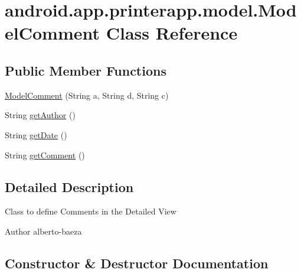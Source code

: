 \hypertarget{classandroid_1_1app_1_1printerapp_1_1model_1_1_model_comment}{}\section{android.\+app.\+printerapp.\+model.\+Model\+Comment Class Reference}
\label{classandroid_1_1app_1_1printerapp_1_1model_1_1_model_comment}
\subsection*{Public Member Functions}
\begin{DoxyCompactItemize}
\item 
\hyperlink{classandroid_1_1app_1_1printerapp_1_1model_1_1_model_comment_aa436158402c16efc4be81428acd95403}{Model\+Comment} (String a, String d, String c)
\item 
String \hyperlink{classandroid_1_1app_1_1printerapp_1_1model_1_1_model_comment_ace106bfb3038d89c255280ff3986ca50}{get\+Author} ()
\item 
String \hyperlink{classandroid_1_1app_1_1printerapp_1_1model_1_1_model_comment_a165d8a25e2879be1b15782c64f716447}{get\+Date} ()
\item 
String \hyperlink{classandroid_1_1app_1_1printerapp_1_1model_1_1_model_comment_a26cf2f8796cc2de796abcc377f2091c4}{get\+Comment} ()
\end{DoxyCompactItemize}


\subsection{Detailed Description}
Class to define Comments in the Detailed View \begin{DoxyAuthor}{Author}
alberto-\/baeza 
\end{DoxyAuthor}


\subsection{Constructor \& Destructor Documentation}
\mbox{\label{classandroid_1_1app_1_1printerapp_1_1model_1_1_model_comment_aa436158402c16efc4be81428acd95403}} 
